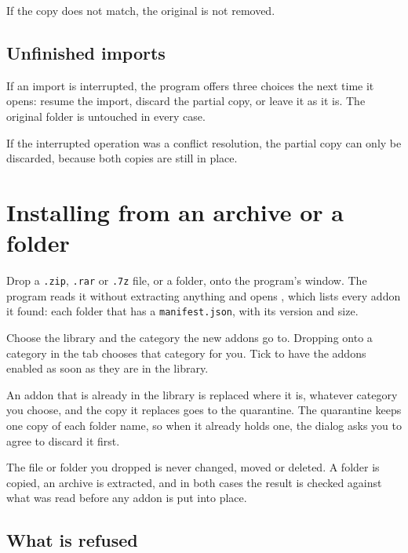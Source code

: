 \documentclass[11pt,a4paper]{article}
\begin{document}
If the copy does not match, the original is not removed.

\subsection{Unfinished imports}

If an import is interrupted, the program offers three choices the next time it
opens: resume the import, discard the partial copy, or leave it as it is. The
original folder is untouched in every case.

If the interrupted operation was a conflict resolution, the partial copy can
only be discarded, because both copies are still in place.

\section{Installing from an archive or a folder}

Drop a \texttt{.zip}, \texttt{.rar} or \texttt{.7z} file, or a folder, onto the
program's window. The program reads it without extracting anything and opens
, which lists every addon it found: each folder
that has a \texttt{manifest.json}, with its version and size.

Choose the library and the category the new addons go to. Dropping onto a
category in the  tab chooses that category for you. Tick
 to have the addons enabled as soon as they are in
the library.

An addon that is already in the library is replaced where it is, whatever
category you choose, and the copy it replaces goes to the quarantine. The
quarantine keeps one copy of each folder name, so when it already holds one,
the dialog asks you to agree to discard it first.


The file or folder you dropped is never changed, moved or deleted. A folder is
copied, an archive is extracted, and in both cases the result is checked
against what was read before any addon is put into place.

\subsection{What is refused}
\end{document}
